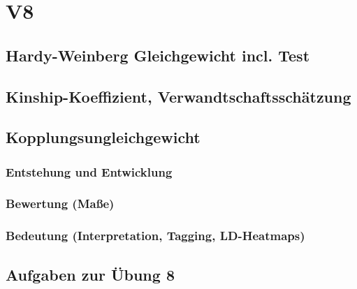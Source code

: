 \section{V8}
\subsection{Hardy-Weinberg Gleichgewicht incl. Test}

\subsection{Kinship-Koeffizient, Verwandtschaftsschätzung}

\subsection{Kopplungsungleichgewicht}

\subsubsection{Entstehung und Entwicklung}

\subsubsection{Bewertung (Maße)}

\subsubsection{Bedeutung (Interpretation, Tagging, LD-Heatmaps)}

\subsection{Aufgaben zur Übung 8}